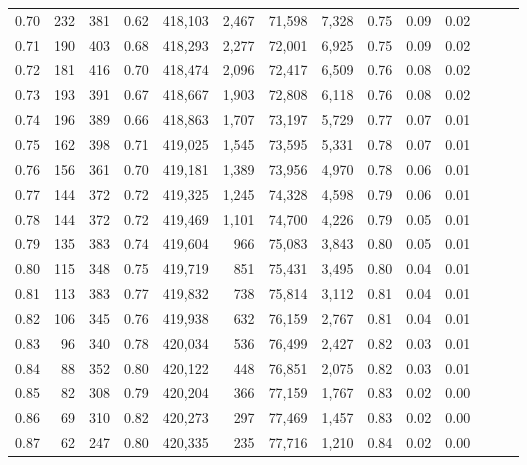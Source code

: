 \begin{tabular}{rrrrrrrrrrrrrr}
0.70 &     232 &    381 &  0.62 &  418,103 &    2,467 &  71,598 &   7,328 &  0.75 &  0.09 &      0.02 \\
0.71 &     190 &    403 &  0.68 &  418,293 &    2,277 &  72,001 &   6,925 &  0.75 &  0.09 &      0.02 \\
0.72 &     181 &    416 &  0.70 &  418,474 &    2,096 &  72,417 &   6,509 &  0.76 &  0.08 &      0.02 \\
0.73 &     193 &    391 &  0.67 &  418,667 &    1,903 &  72,808 &   6,118 &  0.76 &  0.08 &      0.02 \\
0.74 &     196 &    389 &  0.66 &  418,863 &    1,707 &  73,197 &   5,729 &  0.77 &  0.07 &      0.01 \\
0.75 &     162 &    398 &  0.71 &  419,025 &    1,545 &  73,595 &   5,331 &  0.78 &  0.07 &      0.01 \\
0.76 &     156 &    361 &  0.70 &  419,181 &    1,389 &  73,956 &   4,970 &  0.78 &  0.06 &      0.01 \\
0.77 &     144 &    372 &  0.72 &  419,325 &    1,245 &  74,328 &   4,598 &  0.79 &  0.06 &      0.01 \\
0.78 &     144 &    372 &  0.72 &  419,469 &    1,101 &  74,700 &   4,226 &  0.79 &  0.05 &      0.01 \\
0.79 &     135 &    383 &  0.74 &  419,604 &      966 &  75,083 &   3,843 &  0.80 &  0.05 &      0.01 \\
0.80 &     115 &    348 &  0.75 &  419,719 &      851 &  75,431 &   3,495 &  0.80 &  0.04 &      0.01 \\
0.81 &     113 &    383 &  0.77 &  419,832 &      738 &  75,814 &   3,112 &  0.81 &  0.04 &      0.01 \\
0.82 &     106 &    345 &  0.76 &  419,938 &      632 &  76,159 &   2,767 &  0.81 &  0.04 &      0.01 \\
0.83 &      96 &    340 &  0.78 &  420,034 &      536 &  76,499 &   2,427 &  0.82 &  0.03 &      0.01 \\
0.84 &      88 &    352 &  0.80 &  420,122 &      448 &  76,851 &   2,075 &  0.82 &  0.03 &      0.01 \\
0.85 &      82 &    308 &  0.79 &  420,204 &      366 &  77,159 &   1,767 &  0.83 &  0.02 &      0.00 \\
0.86 &      69 &    310 &  0.82 &  420,273 &      297 &  77,469 &   1,457 &  0.83 &  0.02 &      0.00 \\
0.87 &      62 &    247 &  0.80 &  420,335 &      235 &  77,716 &   1,210 &  0.84 &  0.02 &      0.00 \\

\end{tabular}
